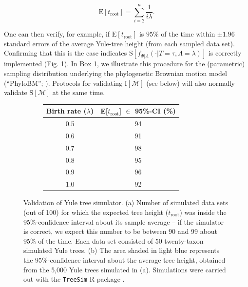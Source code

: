 \documentclass[oneside]{article}
\begin{document}
\begin{equation}
  \text{E}[t_{\text{root}}] = \sum_{i=2}^{n}\frac{1}{i\lambda}.
  \label{eq:yule}
\end{equation}

\noindent One can then verify, for example, if $\text{E}[t_{\text{root}}]$ is $95\%$ of the time within $\pm 1.96$ standard errors of the average Yule-tree height (from each sampled data set).
Confirming that this is the case indicates $\text{S}[f_{\Phi|\Lambda}(\cdot|T=\tau,\Lambda=\lambda)]$ is correctly implemented (Fig. \ref{fig:yulemean}).
In Box 1, we illustrate this procedure for the (parametric) sampling distribution underlying the phylogenetic Brownian motion model (``PhyloBM''; \citealp{f73}).
Protocols for validating $\text{I}[\mathcal{M}]$ (see below) will also normally validate $\text{S}[\mathcal{M}]$ at the same time.

\begin{figure}
  \centering
  \vspace{0pt}
  \begin{subfigure}[t]{0.5\textwidth}
    \caption{}
    \centering
    \begin{tabular}{ cc }
    \hline
    Birth rate ($\lambda$) & E[$t_{\text{root}}$] $\in$ 95\%-CI (\%)\\
    \hline  
    \rowcolor{gray!10}0.5 & 94\\
    0.6 & 91\\
    \rowcolor{gray!10}0.7 & 98\\
    0.8 & 95\\
    \rowcolor{gray!10}0.9 & 96\\
    1.0 & 92
  \end{tabular}
  \end{subfigure}
  \vspace{0pt}
  \hspace{1cm}
  \begin{subfigure}[t]{0.4\textwidth}
    \caption{}
    \centering
        
  \end{subfigure}
  \hfill
  \caption{Validation of Yule tree simulator.
    (a) Number of simulated data sets (out of 100) for which the
    expected tree height ($t_{\text{root}}$) was inside the 95\%-confidence interval
    about its sample average -- if the simulator is correct, we expect
    this number to be between 90 and 99 about 95\% of the time.
    Each data set consisted of 50 twenty-taxon simulated Yule trees.
    (b) The area shaded in light blue represents the
    95\%-confidence interval about the average tree height, obtained
    from the 5,000 Yule trees simulated in (a). Simulations were
    carried out with the \texttt{TreeSim} R package \citep{stadler11}.}
  \label{fig:yulemean}
\end{figure}
\end{document}
